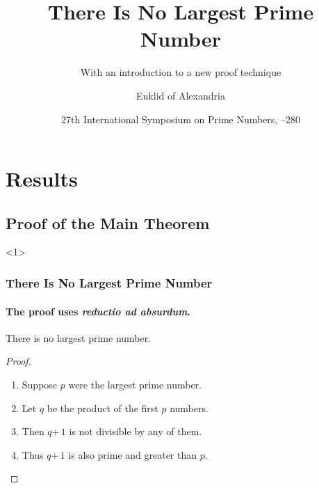 %
%
%

\beamertemplatetransparentcovered

\title{There Is No Largest Prime Number}
\subtitle{With an introduction to a new proof technique}

\author[Euklid]{Euklid of Alexandria}
\date[ISPN '80]{27th International Symposium on Prime Numbers, --280}



\begin{frame}
  \titlepage
  \tableofcontents
\end{frame}

\section{Results}
\subsection{Proof of the Main Theorem}

\begin{frame}<1>
  \frametitle{There Is No Largest Prime Number}
  \framesubtitle{The proof uses \textit{reductio ad absurdum}.}

  \begin{theorem}
    There is no largest prime number.
  \end{theorem}
  \begin{proof}
    \begin{enumerate}
    \item<1-| alert@1> Suppose $p$ were the largest prime number.
    \item<2-> Let $q$ be the product of the first $p$ numbers.
    \item<3-> Then $q$\;+\,$1$ is not divisible by any of them.
    \item<1-> Thus $q$\;+\,$1$ is also prime and greater than $p$.\qedhere
    \end{enumerate}
  \end{proof}
\end{frame}


